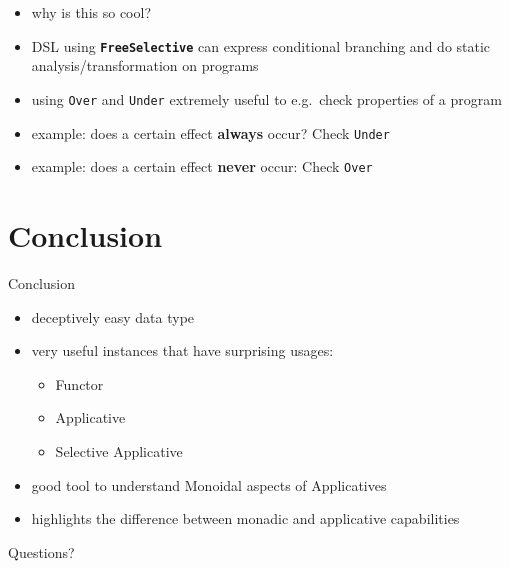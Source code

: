 \documentclass[aspectratio=169]{beamer}
\begin{document}
\begin{frame}[fragile]
  \begin{itemize}
  \item why is this so cool?
  \item DSL using \textbf{\texttt{FreeSelective}} can express conditional branching and do
    static analysis/transformation on programs
  \item using \texttt{Over} and \texttt{Under} extremely useful to e.g.\ check properties of a program
  \item example: does a certain effect \textbf{always} occur? Check \texttt{Under}
  \item example: does a certain effect \textbf{never} occur: Check \texttt{Over}
  \end{itemize}
\end{frame}

\section{Conclusion}
\begin{frame}
  \begin{center}
    \Huge Conclusion
  \end{center}
\end{frame}

\begin{frame}
  \begin{itemize}
  \item deceptively easy data type
  \item very useful instances that have surprising usages:
    \begin{itemize}
    \item Functor
    \item Applicative
    \item Selective Applicative
    \end{itemize}
  \item good tool to understand Monoidal aspects of Applicatives
  \item highlights the difference between monadic and applicative
    capabilities
  \end{itemize}
\end{frame}

\begin{frame}
  \begin{center}
    \Huge{}
    Questions?
  \end{center}
\end{frame}

\appendix{}
\end{document}
